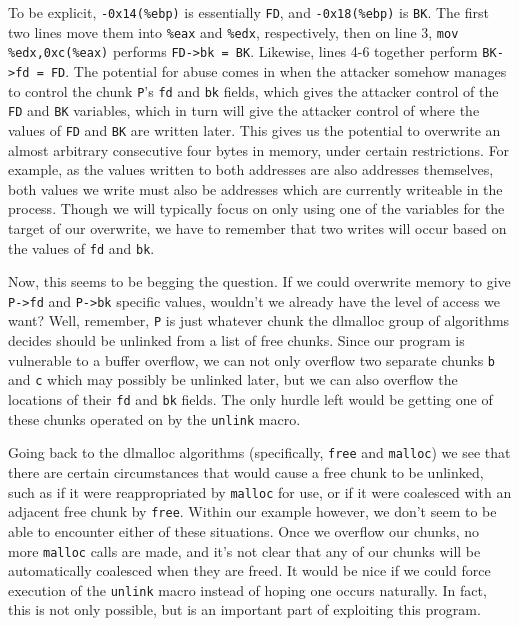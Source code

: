 To be explicit, \texttt{-0x14(\%ebp)} is essentially \texttt{FD}, and
\texttt{-0x18(\%ebp)} is \texttt{BK}. The first two lines move them into
\texttt{\%eax} and \texttt{\%edx}, respectively, then on line 3,
\texttt{mov \%edx,0xc(\%eax)} performs \texttt{FD->bk = BK}. Likewise,
lines 4-6 together perform \texttt{BK->fd = FD}. The potential for
abuse comes in when the attacker somehow manages to control
the chunk \texttt{P}'s \texttt{fd} and \texttt{bk} fields, which 
gives the attacker control of the \texttt{FD} and \texttt{BK} variables,
which in turn will give the attacker control of where the values
of \texttt{FD} and \texttt{BK} are written later. This gives us
the potential to overwrite an almost arbitrary consecutive four bytes
in memory, under certain restrictions. For example, as the values written
to both addresses are also addresses themselves, both values we
write must also be addresses which are currently writeable in the process.
Though we will typically focus on only using one of the variables
for the target of our overwrite, we have to remember that two
writes will occur based on the values of \texttt{fd} and \texttt{bk}.

Now, this seems to be begging the question. If we could overwrite memory
to give \texttt{P->fd} and \texttt{P->bk} specific values, wouldn't
we already have the level of access we want? Well, remember, \texttt{P}
is just whatever chunk the dlmalloc group of algorithms decides should
be unlinked from a list of free chunks. Since our program is vulnerable
to a buffer overflow, we can not only overflow two separate chunks
\texttt{b} and \texttt{c} which may possibly be unlinked later, but we can also
overflow the locations of their \texttt{fd} and \texttt{bk} fields. The
only hurdle left would be getting one of these chunks operated
on by the \texttt{unlink} macro.

Going back to the dlmalloc algorithms (specifically, \texttt{free} and \texttt{malloc})
we see that there are certain circumstances that would cause a free chunk
to be unlinked, such as if it were reappropriated by \texttt{malloc} for
use, or if it were coalesced with an adjacent free chunk by \texttt{free}.
Within our example however, we don't seem to be able to encounter either
of these situations. Once we overflow our chunks, no more \texttt{malloc}
calls are made, and it's not clear that any of our chunks will be
automatically coalesced when they are freed. It would be nice if we could
force execution of the \texttt{unlink} macro instead of hoping one
occurs naturally. In fact, this is not only possible, but is an important
part of exploiting this program.


